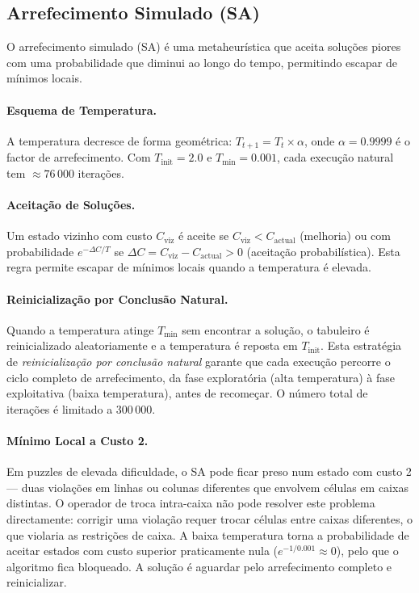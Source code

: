 \subsection{Arrefecimento Simulado (SA)}
\label{ssec:sa}

O arrefecimento simulado (SA) \cite{kirkpatrick1983optimization} é uma metaheurística que aceita soluções piores com uma probabilidade que diminui ao longo do tempo, permitindo escapar de mínimos locais.

\paragraph{Esquema de Temperatura.}
A temperatura decresce de forma geométrica: $T_{t+1} = T_t \times \alpha$, onde $\alpha = 0.9999$ é o factor de arrefecimento. Com $T_{\text{init}} = 2.0$ e $T_{\text{min}} = 0.001$, cada execução natural tem $\approx 76\,000$ iterações.

\paragraph{Aceitação de Soluções.}
Um estado vizinho com custo $C_{\text{viz}}$ é aceite se $C_{\text{viz}} < C_{\text{actual}}$ (melhoria) ou com probabilidade $e^{-\Delta C / T}$ se $\Delta C = C_{\text{viz}} - C_{\text{actual}} > 0$ (aceitação probabilística). Esta regra permite escapar de mínimos locais quando a temperatura é elevada.

\paragraph{Reinicialização por Conclusão Natural.}
Quando a temperatura atinge $T_{\text{min}}$ sem encontrar a solução, o tabuleiro é reinicializado aleatoriamente e a temperatura é reposta em $T_{\text{init}}$. Esta estratégia de \emph{reinicialização por conclusão natural} garante que cada execução percorre o ciclo completo de arrefecimento, da fase exploratória (alta temperatura) à fase exploitativa (baixa temperatura), antes de recomeçar. O número total de iterações é limitado a $300\,000$.

\paragraph{Mínimo Local a Custo 2.}
Em puzzles de elevada dificuldade, o SA pode ficar preso num estado com custo 2 — duas violações em linhas ou colunas diferentes que envolvem células em caixas distintas. O operador de troca intra-caixa não pode resolver este problema directamente: corrigir uma violação requer trocar células entre caixas diferentes, o que violaria as restrições de caixa. A baixa temperatura torna a probabilidade de aceitar estados com custo superior praticamente nula ($e^{-1/0.001} \approx 0$), pelo que o algoritmo fica bloqueado. A solução é aguardar pelo arrefecimento completo e reinicializar.

